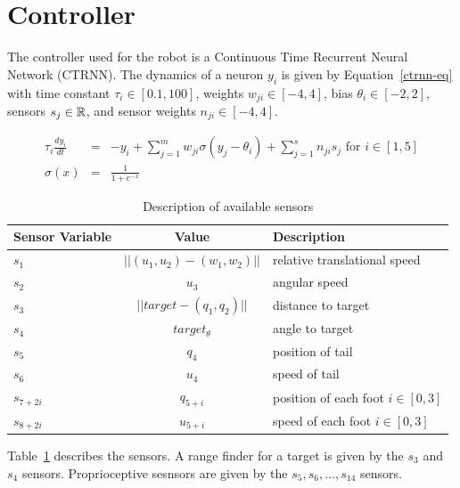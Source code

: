 \section{Controller}

The controller used for the robot is a Continuous Time Recurrent
Neural Network (CTRNN).  The dynamics of a neuron $y_i$ is given by
Equation~\ref{ctrnn-eq} with time constant $\tau_i \in [0.1, 100]$,
weights $w_{ji} \in [-4, 4]$, bias $\theta_i \in [-2, 2]$, sensors
$s_j \in \mathbb{R} $, and sensor weights $n_{ji} \in [-4, 4]$.

\begin{eqnarray}
  \tau_i \frac{d y_i}{dt} &=& -y_i + \sum_{j = 1}^m w_{ji} \sigma(y_j - \theta_i) + \sum_{j=1}^s n_{ji} s_j \text{ for } i \in [1,5] \label{ctrnn-eq} \\
  \sigma(x) &=& \frac{1}{1 + e^{-x}}
\end{eqnarray}

\begin{table}
  \begin{center}
    \begin{tabular}{ | l | c | l | }
      \hline
      Sensor Variable & Value & Description \\
      \hline
      $s_1$ & $||(u_1, u_2) - (w_1, w_2)||$ & relative translational speed \\
      $s_2$ & $u_3$ & angular speed \\
      $s_3$ & $||target - (q_1, q_2)||$ & distance to target \\ 
      $s_4$ & $target_\theta$ & angle to target \\              
      $s_5$ & $q_4$ & position of tail \\                       
      $s_6$ & $u_4$ & speed of tail \\                          
      $s_{7 + 2 i}$ & $q_{5 + i}$ & position of each foot $i \in [0, 3]$ \\        
      $s_{8 + 2 i}$ & $u_{5 + i}$ & speed of each foot $i \in [0, 3]$ \\           
      \hline
    \end{tabular}
  \end{center}
  \caption[Sensors]{\label{table:sensor}Description of available sensors}
\end{table}

Table~\ref{table:sensor} describes the sensors.  A range finder for a
target is given by the $s_3$ and $s_4$ sensors.  Proprioceptive
sesnsors are given by the $s_5, s_6, \ldots, s_{14}$ sensors.

